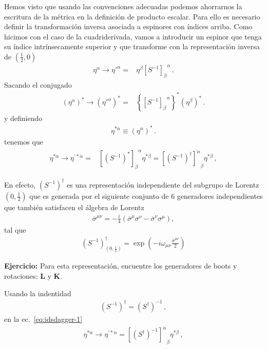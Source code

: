 \begin{frame}
Hemos visto que usando las convenciones adecuadas podemos ahorrarnos
la escritura de la métrica en la definición de producto escalar.
%
Para ello es necesario definir la transformación inversa asociada a
espinores con índices arriba. Como hicimos con el caso de la cuadriderivada, vamos a introducir un espinor que tenga su índice intrínsecamente superior y que transforme con la representación inversa de $(\frac{1}{2},0)$
\begin{align}
  \label{eq:superalpha}
  \eta^{\alpha}\to {\eta'}^{\alpha} =&\eta^\beta{\left[  S^{-1}  \right]_{\beta}}^{\alpha}\,.
\end{align}
Sacando el conjugado
\begin{align}
 \left( \eta^{\alpha} \right)^{*}\to \left( {\eta'}^{\alpha} \right)^{*} =&\left\{ {\left[  S^{-1}  \right]_{\beta}}^{\alpha} \right\}^{*} \left( \eta^\beta \right)^{*}\,.
\end{align}
y definiendo
\begin{align}
\eta^{*\dot{\alpha}}\equiv  \left( \eta^{\alpha} \right)^{*}\,.
\end{align}
tenemos que
\begin{align*}
  \eta^{*\dot{\alpha}}\to \eta^{\prime *\dot{\alpha}}
  =& {\left[ \left( S^{-1} \right)^{*} \right]_{\dot{\beta}}}^{\dot{\alpha}}\eta^{*\dot{\beta}}={\left[ \left( S^{-1} \right)^{\dagger} \right]^{\dot{\alpha}}}_{\dot{\beta}}\eta^{*\dot{\beta}}\,,
\end{align*}

En efecto, $\left( S^{-1} \right)^{\dagger}$ es una representación independiente del subgrupo de Lorentz $(0,\frac{1}{2})$ que es generada por el siguiente conjunto de 6 generadores independientes que también satisfacen el álgebra de Lorentz
\begin{align*}
  \overline{\sigma}^{\mu\nu}=-\frac{i}{4} \left( \overline{\sigma}^{\mu}\sigma^{\nu}-\overline{\sigma}^{\nu}\sigma^{\mu} \right),
\end{align*}
tal que
\begin{align*}
\left( S^{-1} \right)^{\dagger}_{(0,\frac{1}{2})}=\exp \left( -i \omega_{\mu\nu} \frac{\overline{\sigma}^{\mu\nu}}{2} \right)
\end{align*}

\textbf{Ejercicio:} Para esta representación, encuentre los generadores de boots y rotaciones: $\boldsymbol{L}$ y $\boldsymbol{K}$.

\end{frame}

\begin{frame}
Usando la indentidad
\begin{align}
  \label{eq:idsdagger-1}
  \left(S^{-1}\right)^\dagger = \left(S^\dagger\right)^{-1} \,,
\end{align}
en la ec.~\eqref{eq:idsdagger-1} 
\begin{align}
  \label{eq:spinorright}
  \eta^{*\dot{\alpha}}\to \eta^{\prime *\dot{\alpha}}
  ={\left[ \left( S^{\dagger} \right)^{-1} \right]^{\dot{\alpha}}}_{\dot{\beta}}\eta^{*\dot{\beta}}\,,
\end{align}
\end{frame}

